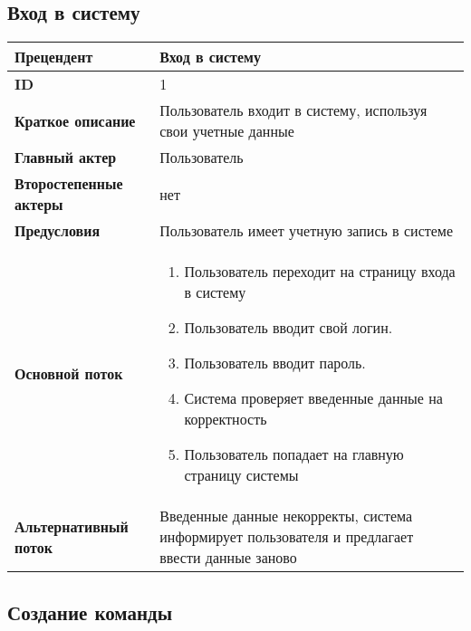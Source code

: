 \documentclass[14pt,a4paper]{extarticle}
\begin{document}
\subsection{Вход в систему}

\begin{tabular}{|l|p{9cm}|}
	\hline
	\textbf{Прецендент}            & Вход в систему                                                                                  \\
	\hline
	\textbf{ID}                    & 1                                                                                               \\
	\hline
	\textbf{Краткое описание}      & Пользователь входит в систему, используя свои учетные данные                                    \\
	\hline
	\textbf{Главный актер}         & Пользователь                                                                                    \\
	\hline
	\textbf{Второстепенные актеры} & нет                                                                                             \\
	\hline
	\textbf{Предусловия}           & Пользователь имеет учетную запись в системе                                                     \\
	\hline
	\textbf{Основной поток}        & \begin{enumerate}
		                                 \item Пользователь переходит на страницу входа в систему
		                                 \item Пользователь вводит свой логин.
		                                 \item Пользователь вводит пароль.
		                                 \item Система проверяет введенные данные на корректность
		                                 \item Пользователь попадает на главную страницу системы
	                                 \end{enumerate}                                         \\
	\hline
	\textbf{Альтернативный поток}  & Введенные данные некорректы, система информирует пользователя и предлагает ввести данные заново \\
	\hline
\end{tabular}

\subsection{Создание команды}
\end{document}
